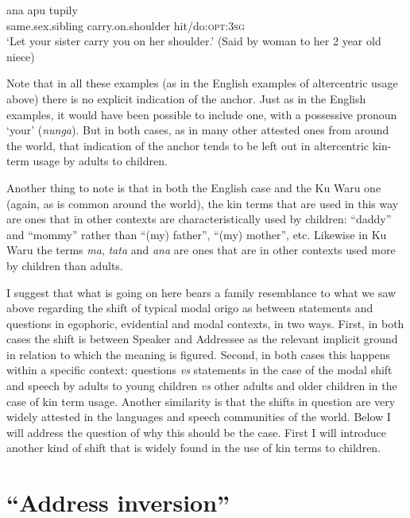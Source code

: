 \documentclass[output=paper]{langsci/langscibook}
\begin{document}
\begin{exe}
	\ex \label{ex:rumsey:ar19}
	\gll ana apu tupily\\
	same.sex.sibling carry.on.shoulder hit/do:\textsc{opt}:3\textsc{sg}\\
	\trans ‘Let your sister carry you on her shoulder.’ (Said by woman to her 2\textonehalf{} year old niece)
\end{exe}

Note that in all these examples (as in the English examples of altercentric usage above) there is no explicit indication of the anchor. Just as in the English examples, it would have been possible to include one, with a possessive pronoun ‘your’ (\textit{nunga}). But in both cases, as in many other attested ones from around the world, that indication of the anchor tends to be left out in altercentric kin-term usage by adults to children. 	

Another thing to note is that in both the English case and the Ku Waru one (again, as is common around the world), the kin terms that are used in this way are ones that in other contexts are characteristically used by children: “daddy” and “mommy” rather than “(my) father”, “(my) mother”, etc. Likewise in Ku Waru the terms \textit{ma}, \textit{tata} and \textit{ana} are ones that are in other contexts used more by children than adults. 

I suggest that what is going on here bears a family resemblance to what we saw above regarding the shift of typical modal origo as between statements and questions in egophoric, evidential and modal contexts, in two ways. First, in both cases the shift is between Speaker and Addressee as the relevant implicit ground in relation to which the meaning is figured.  Second, in both cases this happens within a specific context: questions \textit{vs} statements in the case of the modal shift and speech by adults to young children \textit{vs} other adults and older children in the case of kin term usage. Another similarity is that the shifts in question are very widely attested in the languages and speech communities of the world. Below I will address the question of why this should be the case. First I will introduce another kind of shift that is widely found in the use of kin terms to children.

\section{“Address inversion”}\label{s:ar4}
\end{document}
